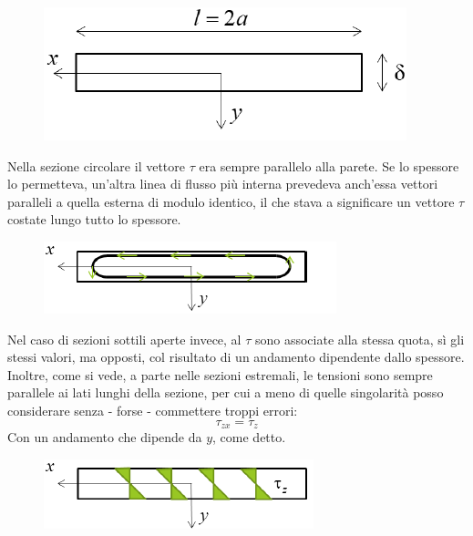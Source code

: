 \begin{figure}[H]
	\centering
	\label{fig:screenshot005}
	\includegraphics[width=0.5\linewidth]{immagini_5/screenshot005}
\end{figure}

		
			 Nella sezione circolare il vettore $\tau$ era sempre parallelo alla parete. Se lo spessore lo permetteva, un'altra linea di flusso più interna prevedeva anch'essa vettori paralleli a quella esterna di modulo identico, il che stava a significare un vettore $\tau$ costate lungo tutto lo spessore.  
			 
			 \begin{figure}[H]
			 	\centering
			 	\includegraphics[width=0.5\linewidth]{immagini_5/screenshot006}
			 	\label{fig:screenshot006}
			 \end{figure}
			 
			 Nel caso di sezioni sottili aperte invece, al $\tau$ sono associate alla stessa quota, sì gli stessi valori, ma opposti, col risultato di un andamento dipendente dallo spessore. Inoltre, come si vede, a parte nelle sezioni estremali, le tensioni sono sempre parallele ai lati lunghi della sezione, per cui a meno di quelle singolarità posso considerare senza - forse - commettere troppi errori:
			 \[ \tau_{zx} = \tau_z\]
			 Con un andamento che dipende da $y$, come detto. 
			 
\begin{figure}[H]
	\centering
	\includegraphics[width=0.5\linewidth]{immagini_5/screenshot007}
	\label{fig:screenshot007}
\end{figure}

